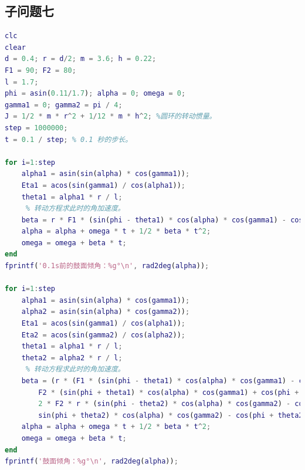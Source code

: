 \documentclass{cumcm}
\begin{document}
\subsection{子问题七}
\begin{lstlisting}[language=matlab]
clc
clear
d = 0.4; r = d/2; m = 3.6; h = 0.22;
F1 = 90; F2 = 80;
l = 1.7;
phi = asin(0.11/1.7); alpha = 0; omega = 0;
gamma1 = 0; gamma2 = pi / 4;
J = 1/2 * m * r^2 + 1/12 * m * h^2; %圆环的转动惯量。
step = 1000000;
t = 0.1 / step; % 0.1 秒的步长。

for i=1:step
    alpha1 = asin(sin(alpha) * cos(gamma1));
    Eta1 = acos(sin(gamma1) / cos(alpha1));
    theta1 = alpha1 * r / l;
     % 转动方程求此时的角加速度。
    beta = r * F1 * (sin(phi - theta1) * cos(alpha) * cos(gamma1) - cos(phi - theta1) * sin(alpha1) * sin(Eta1)) / J;
    alpha = alpha + omega * t + 1/2 * beta * t^2;
    omega = omega + beta * t;
end
fprintf('0.1s前的鼓面倾角：%g°\n', rad2deg(alpha));

for i=1:step
    alpha1 = asin(sin(alpha) * cos(gamma1));
    alpha2 = asin(sin(alpha) * cos(gamma2));
    Eta1 = acos(sin(gamma1) / cos(alpha1));
    Eta2 = acos(sin(gamma2) / cos(alpha2));
    theta1 = alpha1 * r / l;
    theta2 = alpha2 * r / l;
     % 转动方程求此时的角加速度。
    beta = (r * (F1 * (sin(phi - theta1) * cos(alpha) * cos(gamma1) - cos(phi - theta1) * sin(alpha1) * sin(Eta1)) - ...
        F2 * (sin(phi + theta1) * cos(alpha) * cos(gamma1) + cos(phi + theta1) * sin(alpha1) * sin(Eta1))) + ...
        2 * F2 * r * (sin(phi - theta2) * cos(alpha) * cos(gamma2) - cos(phi - theta2) * sin(alpha2) * sin(Eta2) - ...
        sin(phi + theta2) * cos(alpha) * cos(gamma2) - cos(phi + theta2) * sin(alpha2) * sin(Eta2))) / J;
    alpha = alpha + omega * t + 1/2 * beta * t^2;
    omega = omega + beta * t;
end
fprintf('鼓面倾角：%g°\n', rad2deg(alpha));
\end{lstlisting}
\end{document}
